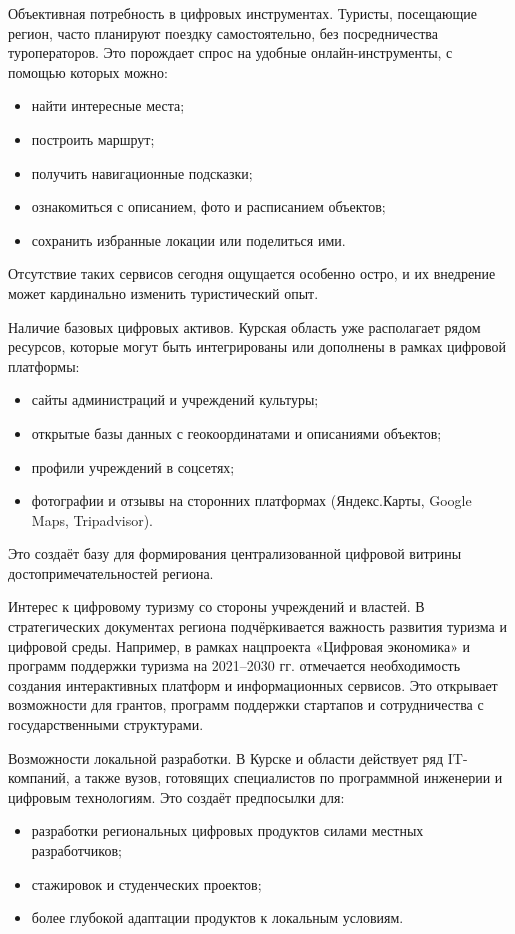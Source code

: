 Объективная потребность в цифровых инструментах.
Туристы, посещающие регион, часто планируют поездку самостоятельно, без посредничества туроператоров. Это порождает спрос на удобные онлайн-инструменты, с помощью которых можно:
\begin{itemize}
	\item найти интересные места;
	\item построить маршрут;
	\item получить навигационные подсказки;
	\item ознакомиться с описанием, фото и расписанием объектов;
	\item сохранить избранные локации или поделиться ими.
\end{itemize}
Отсутствие таких сервисов\cite{b3} сегодня ощущается особенно остро, и их внедрение может кардинально изменить туристический опыт.

Наличие базовых цифровых активов.
Курская область уже располагает рядом ресурсов, которые могут быть интегрированы или дополнены в рамках цифровой платформы:
\begin{itemize}
	\item сайты администраций и учреждений культуры;
	\item открытые базы данных с геокоординатами и описаниями объектов;
	\item профили учреждений в соцсетях;
	\item фотографии и отзывы на сторонних платформах (Яндекс.Карты, Google Maps, Tripadvisor).
\end{itemize}
Это создаёт базу для формирования централизованной цифровой витрины достопримечательностей региона.

Интерес к цифровому туризму со стороны учреждений и властей.
В стратегических документах региона подчёркивается важность развития туризма и цифровой среды. Например, в рамках нацпроекта «Цифровая экономика» и программ поддержки туризма на 2021–2030 гг. отмечается необходимость создания интерактивных платформ и информационных сервисов. Это открывает возможности для грантов, программ поддержки стартапов и сотрудничества с государственными структурами.

Возможности локальной разработки.
В Курске и области действует ряд IT-компаний, а также вузов, готовящих специалистов по программной инженерии и цифровым технологиям. Это создаёт предпосылки для:
\begin{itemize}
	\item разработки региональных цифровых продуктов силами местных разработчиков;
	\item стажировок и студенческих проектов;
	\item более глубокой адаптации продуктов к локальным условиям.
\end{itemize}

